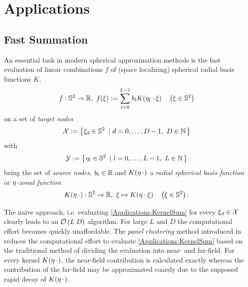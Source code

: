 \chapter{Applications}
\label{Applications}

\section{Fast Summation}
\label{Applications:FastSum}

An essential task in modern spherical approximation methods is the fast evaluation of linear combinations $f$ of (space localizing) spherical radial basis functions $K$,  
\begin{equation}
  \label{Applications:KernelSum}
  f: \mathbb{S}^2 \rightarrow \mathbb{R},\ f{\hspace{-0.4ex}}\left(\xi\right) := \sum_{l = 0}^{L-1} 
    b_{l} K{\hspace{-0.4ex}}\left(\mathbf{\eta}_{l} \cdot \mathbf{\xi}\right) \quad \left(\mathbf{\xi} \in \mathbb{S}^2\right)
\end{equation}
on a set of \emph{target nodes} 
$$
  \mathcal{X} := \left\{\mathbf{\xi}_{d} \in \mathbb{S}^2\ \left|\ d=0,\ldots,D-1,\ D \in \mathbb{N}\right.\right\rbrace
$$ 
with 
$$
  \mathcal{Y} := \left\{\mathbf{\eta}_{l} \in \mathbb{S}^2\ \left|\ l = 0,\ldots,L-1,\ L \in \mathbb{N}\right.\right\rbrace
$$
being the set of \emph{source nodes}, $b_{l} \in \mathbb{R}$ and $K{\hspace{-0.4ex}}\left(\mathbf{\eta} \: \cdot\right)$ a \emph{radial spherical basis function} or \emph{$\mathbf{\eta}$-zonal function} 
\[
  K{\hspace{-0.4ex}}\left(\mathbf{\eta} \: \cdot\right): \mathbb{S}^2 \rightarrow \mathbb{R},\ \mathbf{\xi} \mapsto K{\hspace{-0.4ex}}\left(\mathbf{\eta} \cdot \mathbf{\xi}\right) \quad \left(\mathbf{\xi} \in \mathbb{S}^2\right).\]

The naive approach, i.e. evaluating \eqref{Applications:KernelSum} for every $\mathbf{\xi}_{d} \in \mathcal{X}$ clearly leads to an $\mathcal{O}\left(L\:D\right)$ algorithm. For large $L$ and $D$ the computational effort becomes quickly unaffordable.
The \emph{panel clustering} method introduced in \cite{FrGlSch98} reduces the computational effort to evaluate \eqref{Applications:KernelSum} based on the traditional method of dividing the evaluation into near- and far-field. For every kernel $K{\hspace{-0.4ex}}\left(\mathbf{\eta} \: \cdot\right)$, the near-field contribution is calculated exactly whereas the contribution of the far-field may be approximated coarsly due to the supposed rapid decay of $K{\hspace{-0.4ex}}\left(\mathbf{\eta} \: \cdot\right)$. 

